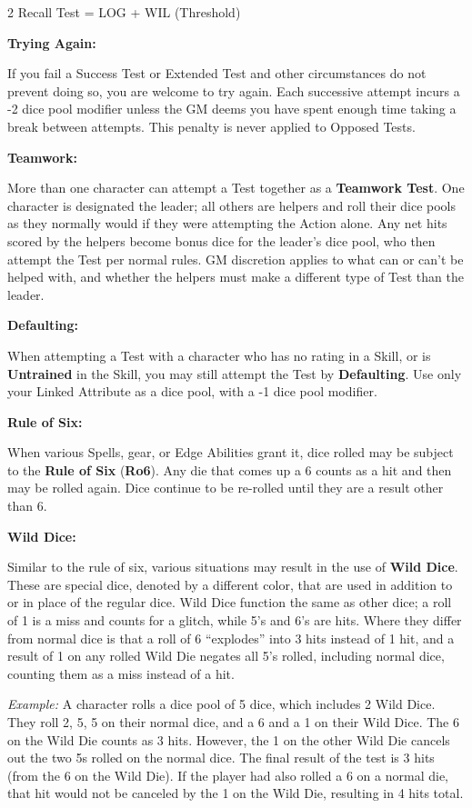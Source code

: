 \documentclass[
  oneside]{article}
\begin{document}
\begin{multicols}{2}
Recall Test = LOG + WIL (Threshold)

\textbf{Trying Again:}

If you fail a Success Test or Extended Test and
other circumstances do not prevent doing so, you
are welcome to try again. Each successive attempt
incurs a -2 dice pool modifier unless the GM deems
you have spent enough time taking a break between
attempts. This penalty is never applied to Opposed
Tests.

\textbf{Teamwork:}

More than one character can attempt a Test
together as a \textbf{Teamwork Test}. One
character is designated the leader; all others are
helpers and roll their dice pools as they normally
would if they were attempting the Action alone.
Any net hits scored by the helpers become bonus
dice for the leader's dice pool, who then attempt
the Test per normal rules. GM discretion applies
to what can or can't be helped with, and whether
the helpers must make a different type of Test
than the leader.

\textbf{Defaulting:}

When attempting a Test with a character who has no
rating in a Skill, or is \textbf{Untrained} in the
Skill, you may still attempt the Test by
\textbf{Defaulting}. Use only your Linked
Attribute as a dice pool, with a -1 dice pool
modifier.

\textbf{Rule of Six:}

When various Spells, gear, or Edge Abilities grant
it, dice rolled may be subject to the \textbf{Rule
of Six} (\textbf{Ro6}). Any die that comes up a 6
counts as a hit and then may be rolled again. Dice
continue to be re-rolled until they are a result
other than 6.

\textbf{Wild Dice:}

Similar to the rule of six, various situations may
result in the use of \textbf{Wild Dice}. These are
special dice, denoted by a different color, that
are used in addition to or in place of the regular
dice. Wild Dice function the same as other dice; a
roll of 1 is a miss and counts for a glitch, while
5's and 6's are hits. Where they differ from
normal dice is that a roll of 6 ``explodes'' into
3 hits instead of 1 hit, and a result of 1 on any
rolled Wild Die negates all 5's rolled, including
normal dice, counting them as a miss instead of a
hit.

\emph{Example:} A character rolls a dice pool of 5
dice, which includes 2 Wild Dice. They roll 2, 5,
5 on their normal dice, and a 6 and a 1 on their
Wild Dice. The 6 on the Wild Die counts as 3 hits.
However, the 1 on the other Wild Die cancels out
the two 5s rolled on the normal dice. The final
result of the test is 3 hits (from the 6 on the
Wild Die). If the player had also rolled a 6 on a
normal die, that hit would not be canceled by the
1 on the Wild Die, resulting in 4 hits total.

\end{multicols}
\end{document}
